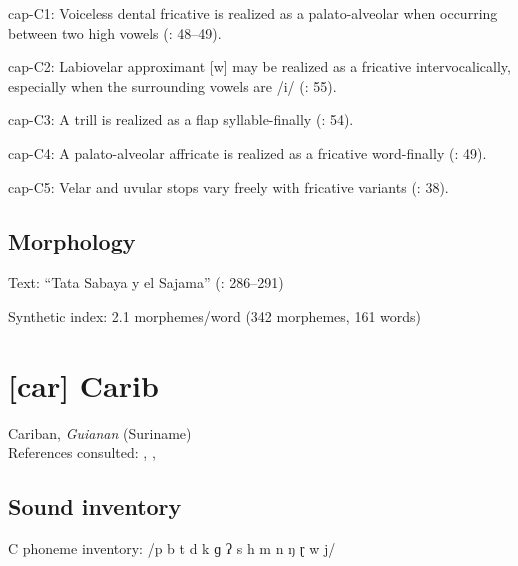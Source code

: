 {\begin{appendixdesc}
\item[cap-C1:] Voiceless dental fricative is realized as a palato-alveolar when occurring between two high vowels (\citealt{Cerrón-Palomino2006}: 48--49).

\item[cap-C2:] Labiovelar approximant [w] may be realized as a fricative intervocalically, especially when the surrounding vowels are /i/ (\citealt{Cerrón-Palomino2006}: 55).

\item[cap-C3:] A trill is realized as a flap syllable-finally (\citealt{Cerrón-Palomino2006}: 54).

\item[cap-C4:] A palato-alveolar affricate is realized as a fricative word-finally (\citealt{Cerrón-Palomino2006}: 49).

\item[cap-C5:] Velar and uvular stops vary freely with fricative variants (\citealt{Cerrón-Palomino2006}: 38).
\end{appendixdesc}
\subsection*{Morphology}

\begin{appendixdesc}

\item[Text:] “Tata Sabaya y el Sajama” (\citealt{Cerrón-Palomino2006}: 286--291)

\item[Synthetic index:] 2.1 morphemes/word (342 morphemes, 161 words)
\end{appendixdesc}
\newpage\section*{[car] Carib}   %
Cariban, \textit{Guianan} (Suriname)\medskip\\
References consulted: \citet{Courtz2008}, \citet{Hoff1968}, \citet{Peasgood1972}

\subsection*{Sound inventory}
\begin{appendixdesc}

\item[C phoneme inventory:] /p b t d k ɡ ʔ s h m n ŋ ɽ w j/


\end{appendixdesc}}

